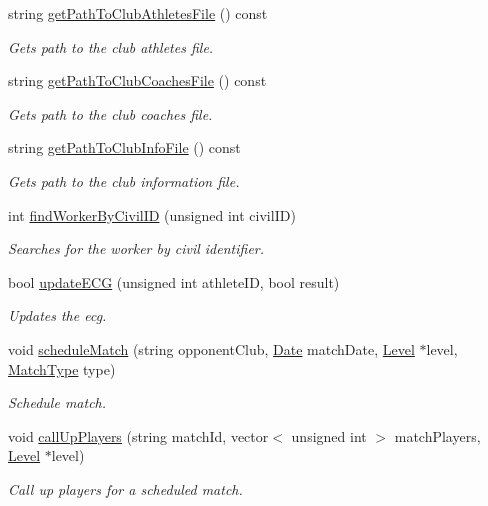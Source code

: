\begin{DoxyCompactItemize}
string \hyperlink{class_club_a08b6495dcd132fd4e7215af14f72234e}{get\+Path\+To\+Club\+Athletes\+File} () const
\begin{DoxyCompactList}\small\item\em Gets path to the club athletes file. \end{DoxyCompactList}\item 
string \hyperlink{class_club_a9da4d254d3ae0844edfd140d8750bb33}{get\+Path\+To\+Club\+Coaches\+File} () const
\begin{DoxyCompactList}\small\item\em Gets path to the club coaches file. \end{DoxyCompactList}\item 
string \hyperlink{class_club_abdac4c28ac139581c4745f08aff90c68}{get\+Path\+To\+Club\+Info\+File} () const
\begin{DoxyCompactList}\small\item\em Gets path to the club information file. \end{DoxyCompactList}\item 
int \hyperlink{class_club_ab308d426042797fc462b485204004eba}{find\+Worker\+By\+Civil\+ID} (unsigned int civil\+ID)
\begin{DoxyCompactList}\small\item\em Searches for the worker by civil identifier. \end{DoxyCompactList}\item 
bool \hyperlink{class_club_a0903daff929fe8647a7a5e97e789c748}{update\+E\+CG} (unsigned int athlete\+ID, bool result)
\begin{DoxyCompactList}\small\item\em Updates the ecg. \end{DoxyCompactList}\item 
void \hyperlink{class_club_a7296755ad0d242ed597d9520c6d79a45}{schedule\+Match} (string opponent\+Club, \hyperlink{class_date}{Date} match\+Date, \hyperlink{class_level}{Level} $\ast$level, \hyperlink{_utils_8hpp_a747637046be33d7273262104aad8069d}{Match\+Type} type)
\begin{DoxyCompactList}\small\item\em Schedule match. \end{DoxyCompactList}\item 
void \hyperlink{class_club_ac7ab630922da1744b1a8223512ae4dc6}{call\+Up\+Players} (string match\+Id, vector$<$ unsigned int $>$ match\+Players, \hyperlink{class_level}{Level} $\ast$level)
\begin{DoxyCompactList}\small\item\em Call up players for a scheduled match. \end{DoxyCompactList}\item 

\end{DoxyCompactItemize}
